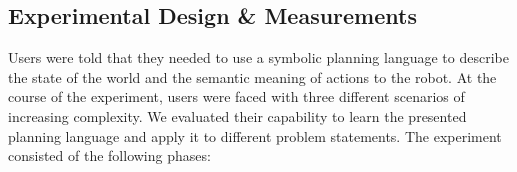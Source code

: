  

\subsection{Experimental Design \& Measurements}
Users were told that they needed to use a symbolic planning language to describe the state of the world and the semantic meaning of actions to the robot. 
At the course of the experiment, users were faced with three different scenarios of increasing complexity. 
We evaluated their capability to learn the presented planning language and apply it to different problem statements.
The experiment consisted of the following phases:
